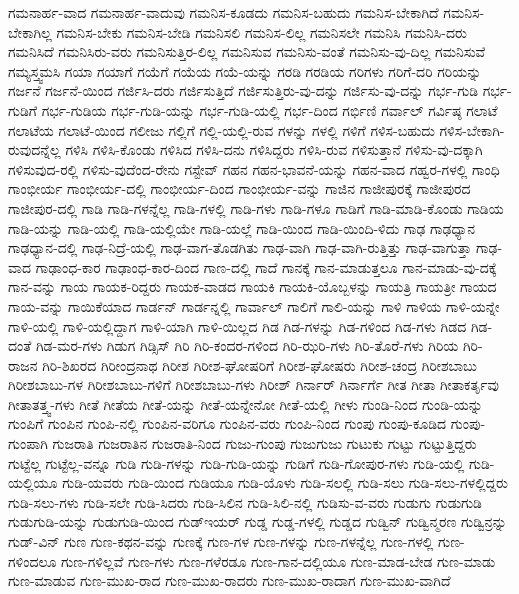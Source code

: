 {ಗಮನಾರ್ಹ-ವಾದ
ಗಮನಾರ್ಹ-ವಾದುವು
ಗಮನಿಸ-ಕೂಡದು
ಗಮನಿಸ-ಬಹುದು
ಗಮನಿಸ-ಬೇಕಾಗಿದೆ
ಗಮನಿಸ-ಬೇಕಾಗಿಲ್ಲ
ಗಮನಿಸ-ಬೇಕು
ಗಮನಿಸ-ಬೇಡಿ
ಗಮನಿಸಲಿ
ಗಮನಿಸ-ಲಿಲ್ಲ
ಗಮನಿಸಲೇ
ಗಮನಿಸಿ
ಗಮನಿಸಿ-ದರು
ಗಮನಿಸಿದೆ
ಗಮನಿಸಿರು-ವರು
ಗಮನಿಸುತ್ತಿರ-ಲಿಲ್ಲ
ಗಮನಿಸುವ
ಗಮನಿಸು-ವಂತೆ
ಗಮನಿಸು-ವು-ದಿಲ್ಲ
ಗಮನಿಸುವೆ
ಗಮ್ಯಸ್ತ್ವಮಸಿ
ಗಯಾ
ಗಯಾಗೆ
ಗಯೆಗೆ
ಗಯೆಯ
ಗಯೆ-ಯನ್ನು
ಗರಡಿ
ಗರಡಿಯ
ಗರಿಗಳು
ಗರಿಗೆ-ದರಿ
ಗರಿಯನ್ನು
ಗರ್ಜನೆ
ಗರ್ಜನೆ-ಯಿಂದ
ಗರ್ಜಿಸಿ-ದರು
ಗರ್ಜಿಸುತ್ತಿದೆ
ಗರ್ಜಿಸುತ್ತಿರು-ವು-ದನ್ನು
ಗರ್ಜಿಸು-ವು-ದನ್ನು
ಗರ್ಭ-ಗುಡಿ
ಗರ್ಭ-ಗುಡಿಗೆ
ಗರ್ಭ-ಗುಡಿಯ
ಗರ್ಭ-ಗುಡಿ-ಯನ್ನು
ಗರ್ಭ-ಗುಡಿ-ಯಲ್ಲಿ
ಗರ್ಭ-ದಿಂದ
ಗರ್ಭಿಣಿ
ಗರ್ವಾಲ್
ಗರ್ವಿಷ್ಠ
ಗಲಾಟೆ
ಗಲಾಟೆಯ
ಗಲಾಟೆ-ಯಿಂದ
ಗಲೀಜು
ಗಲ್ಲಿಗೆ
ಗಲ್ಲಿ-ಯಲ್ಲಿ-ರುವ
ಗಳನ್ನು
ಗಳಲ್ಲಿ
ಗಳಿಗೆ
ಗಳಿಸ-ಬಹುದು
ಗಳಿಸ-ಬೇಕಾಗಿ-ರುವುದನ್ನೆಲ್ಲ
ಗಳಿಸಿ
ಗಳಿಸಿ-ಕೊಂಡು
ಗಳಿಸಿದ
ಗಳಿಸಿ-ದನು
ಗಳಿಸಿದ್ದರು
ಗಳಿಸಿ-ರುವ
ಗಳಿಸುತ್ತಾನೆ
ಗಳಿಸು-ವು-ದಕ್ಕಾಗಿ
ಗಳಿಸುವುದ-ರಲ್ಲಿ
ಗಳಿಸು-ವುದೆಂದ-ರೇನು
ಗಸ್ಟೇವ್
ಗಹನ
ಗಹನ-ಭಾವನೆ-ಯನ್ನು
ಗಹನ-ವಾದ
ಗಹ್ವರ-ಗಳಲ್ಲಿ
ಗಾಂಧಿ
ಗಾಂಭೀರ್ಯ
ಗಾಂಭೀರ್ಯ-ದಲ್ಲಿ
ಗಾಂಭೀರ್ಯ-ದಿಂದ
ಗಾಂಭೀರ್ಯ-ವನ್ನು
ಗಾಜಿನ
ಗಾಜೀಪುರಕ್ಕೆ
ಗಾಜೀಪುರದ
ಗಾಜೀಪುರ-ದಲ್ಲಿ
ಗಾಡಿ
ಗಾಡಿ-ಗಳನ್ನೆಲ್ಲ
ಗಾಡಿ-ಗಳಲ್ಲಿ
ಗಾಡಿ-ಗಳು
ಗಾಡಿ-ಗಳೂ
ಗಾಡಿಗೆ
ಗಾಡಿ-ಮಾಡಿ-ಕೊಂಡು
ಗಾಡಿಯ
ಗಾಡಿ-ಯನ್ನು
ಗಾಡಿ-ಯಲ್ಲಿ
ಗಾಡಿ-ಯಲ್ಲಿಯೇ
ಗಾಡಿ-ಯಲ್ಲೆ
ಗಾಡಿ-ಯಿಂದ
ಗಾಡಿ-ಯಿಂದಿ-ಳಿದು
ಗಾಢ
ಗಾಢಧ್ಯಾನ
ಗಾಢಧ್ಯಾನ-ದಲ್ಲಿ
ಗಾಢ-ನಿದ್ರೆ-ಯಲ್ಲಿ
ಗಾಢ-ವಾಗ-ತೊಡಗಿತು
ಗಾಢ-ವಾಗಿ
ಗಾಢ-ವಾಗಿ-ರುತ್ತಿತ್ತು
ಗಾಢ-ವಾಗುತ್ತಾ
ಗಾಢ-ವಾದ
ಗಾಢಾಂಧ-ಕಾರ
ಗಾಢಾಂಧ-ಕಾರ-ದಿಂದ
ಗಾಣ-ದಲ್ಲಿ
ಗಾದೆ
ಗಾನಕ್ಕೆ
ಗಾನ-ಮಾಡುತ್ತಲೂ
ಗಾನ-ಮಾಡು-ವು-ದಕ್ಕೆ
ಗಾನ-ವನ್ನು
ಗಾಯ
ಗಾಯಕ-ರಿದ್ದರು
ಗಾಯಕ-ವಾಡದ
ಗಾಯಕಿ
ಗಾಯಕಿ-ಯೊಬ್ಬಳನ್ನು
ಗಾಯತ್ರಿ
ಗಾಯತ್ರೀ
ಗಾಯದ
ಗಾಯ-ವನ್ನು
ಗಾಯಿಕೆಯಾದ
ಗಾರ್ಡನ್
ಗಾರ್ಡನ್ನಲ್ಲಿ
ಗಾರ್ವಾಲ್
ಗಾಲಿಗೆ
ಗಾಲಿ-ಯನ್ನು
ಗಾಳಿ
ಗಾಳಿಯ
ಗಾಳಿ-ಯನ್ನೇ
ಗಾಳಿ-ಯಲ್ಲಿ
ಗಾಳಿ-ಯಲ್ಲಿದ್ದಾಗ
ಗಾಳಿ-ಯಾಗಿ
ಗಾಳಿ-ಯಿಲ್ಲದ
ಗಿಡ
ಗಿಡ-ಗಳನ್ನು
ಗಿಡ-ಗಳಿಂದ
ಗಿಡ-ಗಳು
ಗಿಡದ
ಗಿಡ-ದಂತೆ
ಗಿಡ-ಮರ-ಗಳು
ಗಿಡುಗ
ಗಿಡ್ಸಿಸ್
ಗಿರಿ
ಗಿರಿ-ಕಂದರ-ಗಳಿಂದ
ಗಿರಿ-ಝರಿ-ಗಳು
ಗಿರಿ-ತೊರೆ-ಗಳು
ಗಿರಿಯ
ಗಿರಿ-ರಾಜನ
ಗಿರಿ-ಶಿಖರದ
ಗಿರೀಂದ್ರನಾಥ
ಗಿರೀಶ
ಗಿರೀಶ-ಘೋಷರಿಗೆ
ಗಿರೀಶ-ಘೋಷರು
ಗಿರೀಶ-ಚಂದ್ರ
ಗಿರೀಶಬಾಬು
ಗಿರೀಶಬಾಬು-ಗಳ
ಗಿರೀಶಬಾಬು-ಗಳಿಗೆ
ಗಿರೀಶಬಾಬು-ಗಳು
ಗಿರೀಶ್
ಗಿರ್ನಾರ್
ಗಿರ್ನಾರ್ಗೆ
ಗೀತ
ಗೀತಾ
ಗೀತಾಕರ್ತೃವು
ಗೀತಾತತ್ತ್ವ-ಗಳು
ಗೀತೆ
ಗೀತೆಯ
ಗೀತೆ-ಯನ್ನು
ಗೀತೆ-ಯನ್ನೇನೋ
ಗೀತೆ-ಯಲ್ಲಿ
ಗೀಳು
ಗುಂಡಿ-ನಿಂದ
ಗುಂಡಿ-ಯನ್ನು
ಗುಂಪಿಗೆ
ಗುಂಪಿನ
ಗುಂಪಿ-ನಲ್ಲಿ
ಗುಂಪಿನ-ವರಿಗೂ
ಗುಂಪಿನ-ವರು
ಗುಂಪಿ-ನಿಂದ
ಗುಂಪು
ಗುಂಪು-ಕೂಡಿದ
ಗುಂಪು-ಗುಂಪಾಗಿ
ಗುಜರಾತಿ
ಗುಜರಾತಿನ
ಗುಜರಾತಿ-ನಿಂದ
ಗುಜು-ಗುಂಪು
ಗುಜುಗುಜು
ಗುಟುಕು
ಗುಟ್ಟು
ಗುಟ್ಟುತ್ತಿದ್ದರು
ಗುಟ್ಟೆಲ್ಲ
ಗುಟ್ಟೆಲ್ಲ-ವನ್ನೂ
ಗುಡಿ
ಗುಡಿ-ಗಳನ್ನು
ಗುಡಿ-ಗುಡಿ-ಯನ್ನು
ಗುಡಿಗೆ
ಗುಡಿ-ಗೋಪುರ-ಗಳು
ಗುಡಿ-ಯಲ್ಲಿ
ಗುಡಿ-ಯಲ್ಲಿಯೂ
ಗುಡಿ-ಯವರು
ಗುಡಿ-ಯಿಂದ
ಗುಡಿಯೂ
ಗುಡಿ-ಯೊಳು
ಗುಡಿ-ಸಲಲ್ಲಿ
ಗುಡಿ-ಸಲು
ಗುಡಿ-ಸಲು-ಗಳಲ್ಲಿದ್ದರು
ಗುಡಿ-ಸಲು-ಗಳು
ಗುಡಿ-ಸಲೇ
ಗುಡಿ-ಸಿದರು
ಗುಡಿ-ಸಿಲಿನ
ಗುಡಿ-ಸಿಲಿ-ನಲ್ಲಿ
ಗುಡಿಸು-ವ-ವರು
ಗುಡುಗು
ಗುಡುಗುಡಿ
ಗುಡುಗುಡಿ-ಯನ್ನು
ಗುಡುಗುಡಿ-ಯಿಂದ
ಗುಡ್ಇಯರ್
ಗುಡ್ಡ
ಗುಡ್ಡ-ಗಳಲ್ಲಿ
ಗುಡ್ಡದ
ಗುಡ್ವಿನ್
ಗುಡ್ವಿನ್ಮರಣ
ಗುಡ್ವಿನ್ರನ್ನು
ಗುಡ್-ವಿನ್
ಗುಣ
ಗುಣ-ಕಥನ-ವನ್ನು
ಗುಣಕ್ಕೆ
ಗುಣ-ಗಳ
ಗುಣ-ಗಳನ್ನು
ಗುಣ-ಗಳನ್ನೆಲ್ಲ
ಗುಣ-ಗಳಲ್ಲಿ
ಗುಣ-ಗಳಿಂದಲೂ
ಗುಣ-ಗಳಿಲ್ಲವೆ
ಗುಣ-ಗಳು
ಗುಣ-ಗಳೆರಡೂ
ಗುಣ-ಗಾನ-ದಲ್ಲಿಯೂ
ಗುಣ-ಮಾಡ-ಬೇಡ
ಗುಣ-ಮಾಡು
ಗುಣ-ಮಾಡುವ
ಗುಣ-ಮುಖ-ರಾದ
ಗುಣ-ಮುಖ-ರಾದರು
ಗುಣ-ಮುಖ-ರಾದಾಗ
ಗುಣ-ಮುಖ-ವಾಗಿದೆ
}
